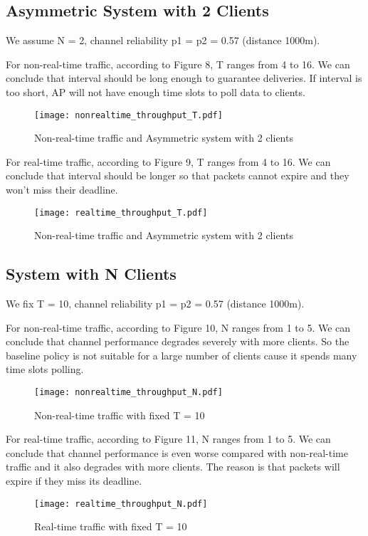 \documentclass{article}
\begin{document}
\subsection{Asymmetric System with 2 Clients}
We assume N = 2, channel reliability p1 = p2 = 0.57 (distance 1000m).

For non-real-time traffic, according to Figure 8, T ranges from 4 to 16. We can conclude that interval should be long enough to guarantee deliveries. If interval is too short, AP will not have enough time slots to poll data to clients. 

\begin{figure}[H]
\centering
\texttt{[image: nonrealtime\_throughput\_T.pdf]}
\caption{Non-real-time traffic and Asymmetric system with 2 clients}
\end{figure}

For real-time traffic, according to Figure 9, T ranges from 4 to 16. We can conclude that interval should be longer so that packets cannot expire and they won't miss their deadline. 

\begin{figure}[H]
\centering
\texttt{[image: realtime\_throughput\_T.pdf]}
\caption{Non-real-time traffic and Asymmetric system with 2 clients}
\end{figure}

\subsection{System with N Clients}
We fix T = 10, channel reliability p1 = p2 = 0.57 (distance 1000m).

For non-real-time traffic, according to Figure 10, N ranges from 1 to 5. We can conclude that channel performance degrades severely with more clients. So the baseline policy is not suitable for a large number of clients cause it spends many time slots polling. 

\begin{figure}[H]
\centering
\texttt{[image: nonrealtime\_throughput\_N.pdf]}
\caption{Non-real-time traffic with fixed T = 10}
\end{figure}

For real-time traffic, according to Figure 11, N ranges from 1 to 5. We can conclude that channel performance is even worse compared with non-real-time traffic and it also degrades with more clients. The reason is that packets will expire if they miss its deadline.  

\begin{figure}[H]
\centering
\texttt{[image: realtime\_throughput\_N.pdf]}
\caption{Real-time traffic with fixed T = 10}
\end{figure}
\end{document}
